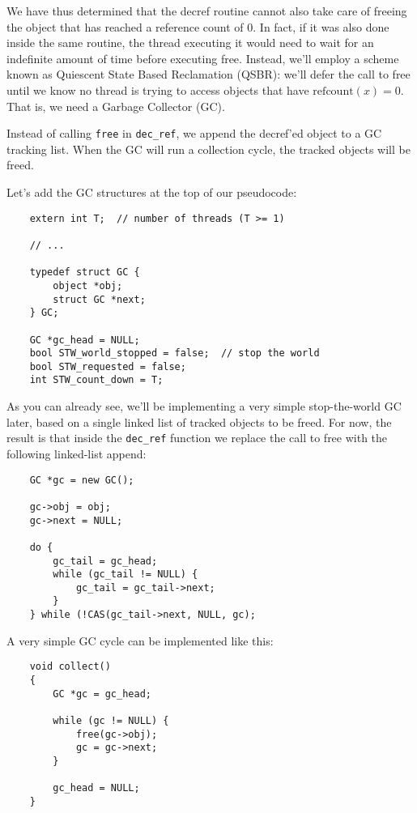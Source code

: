 We have thus determined that the decref routine cannot also take care of freeing the object that has reached a reference count of 0.
In fact, if it was also done inside the same routine, the thread executing it would need to wait for an indefinite amount of time before executing free.
Instead, we'll employ a scheme known as Quiescent State Based Reclamation (QSBR): we'll defer the call to free until we know no thread is trying to access objects that have $\mathrm{refcount}(x) = 0$.
That is, we need a Garbage Collector (GC).

Instead of calling \texttt{free} in \texttt{dec\_ref}, we append the decref'ed object to a GC tracking list.
When the GC will run a collection cycle, the tracked objects will be freed.

Let's add the GC structures at the top of our pseudocode:
\begin{verbatim}
	extern int T;  // number of threads (T >= 1)

	// ...

	typedef struct GC {
	    object *obj;
	    struct GC *next;
	} GC;

	GC *gc_head = NULL;
	bool STW_world_stopped = false;  // stop the world
	bool STW_requested = false;
	int STW_count_down = T;
\end{verbatim}

As you can already see, we'll be implementing a very simple stop-the-world GC later, based on a single linked list of tracked objects to be freed.
For now, the result is that inside the \texttt{dec\_ref} function we replace the call to free with the following linked-list append:
\begin{verbatim}
	GC *gc = new GC();

	gc->obj = obj;
	gc->next = NULL;

	do {
	    gc_tail = gc_head;
	    while (gc_tail != NULL) {
	        gc_tail = gc_tail->next;
	    }
	} while (!CAS(gc_tail->next, NULL, gc);
\end{verbatim}

A very simple GC cycle can be implemented like this:
\begin{verbatim}
	void collect()
	{
	    GC *gc = gc_head;

	    while (gc != NULL) {
	        free(gc->obj);
	        gc = gc->next;
	    }

	    gc_head = NULL;
	}
\end{verbatim}

